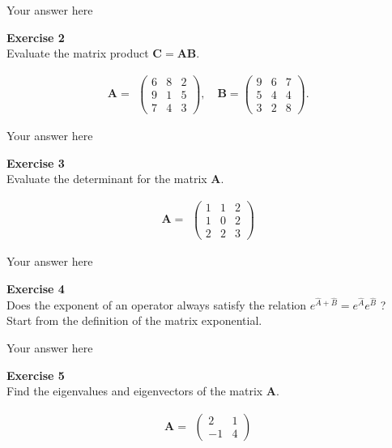 \documentclass{article}
\begin{document}
Your answer here

\begin{mdframed}
\textbf{Exercise 2}\\
Evaluate the matrix product $\mathbf{C} = \mathbf{A}\mathbf{B}$.

\begin{equation}
\mathbf{A} =\begin{aligned}
     \left(\begin{matrix}
     6 & 8 &2 \\ 9 & 1 & 5 \\ 7 & 4 & 3
     \end{matrix}\right),\quad\mathbf{B}=
      \left(\begin{matrix}
     9 & 6 & 7 \\ 5 & 4 & 4 \\  3 & 2 & 8
     \end{matrix}\right).
     \end{aligned}
\end{equation}
\end{mdframed}

Your answer here

\begin{mdframed}
\textbf{Exercise 3}\\
Evaluate the determinant for the matrix $\mathbf{A}$.

\begin{equation}
\mathbf{A}=\begin{aligned}
     \left(\begin{matrix}
     1 & 1 & 2 \\ 1 & 0 & 2 \\ 2 & 2 & 3
     \end{matrix}\right)
     \end{aligned}
\end{equation}
\end{mdframed}

Your answer here

\begin{mdframed}
\textbf{Exercise 4}\\
Does the exponent of an operator always satisfy the relation
$e^{\hat{A}+\hat{B}} = e^{\hat{A}}e^{\hat{B}}$ ? Start from the
definition of the matrix exponential.
\end{mdframed}

Your answer here

\begin{mdframed}
\textbf{Exercise 5}\\
Find the eigenvalues and eigenvectors of the matrix $\mathbf{A}$.

\begin{equation}
\mathbf{A} =\begin{aligned}
     \left(\begin{matrix}
     2 & 1 \\ -1 & 4
     \end{matrix}\right)
    \end{aligned}
\end{equation}
\end{mdframed}
\end{document}

